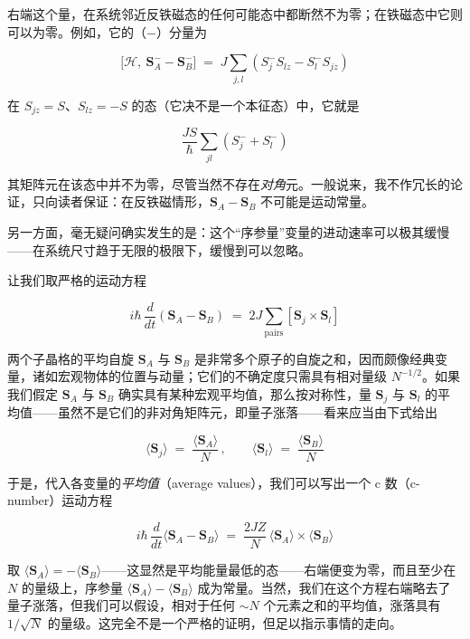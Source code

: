 右端这个量，在系统邻近反铁磁态的任何可能态中都断然不为零；在铁磁态中它则可以为零。例如，它的（−）分量为

\begin{equation*}
\bigl[\mathcal{H},\ \mathbf{S}_A^- - \mathbf{S}_B^-\bigr] \;=\; J\sum_{j,l} \left(S_j^- S_{lz} - S_l^- S_{jz}\right)
\end{equation*}

在 $S_{jz} = S$、$S_{lz} = -S$ 的态（它决不是一个本征态）中，它就是

\begin{equation*}
\frac{JS}{\hbar}\sum_{jl}\left(S_j^- + S_l^-\right)
\end{equation*}

其矩阵元在该态中并不为零，尽管当然不存在\emph{对角}元。一般说来，我不作冗长的论证，只向读者保证：在反铁磁情形，$\mathbf{S}_A - \mathbf{S}_B$ 不可能是运动常量。

另一方面，毫无疑问确实发生的是：这个“序参量”变量的进动速率可以极其缓慢——在系统尺寸趋于无限的极限下，缓慢到可以忽略。

让我们取严格的运动方程

\begin{equation*}
i\hbar\,\frac{d}{dt}\left(\mathbf{S}_A - \mathbf{S}_B\right) \;=\; 2J\sum_{\text{pairs}}\left[\mathbf{S}_j \times \mathbf{S}_l\right]
\end{equation*}

两个子晶格的平均自旋 $\mathbf{S}_A$ 与 $\mathbf{S}_B$ 是非常多个原子的自旋之和，因而颇像经典变量，诸如宏观物体的位置与动量；它们的不确定度只需具有相对量级 $N^{-1/2}$。如果我们假定 $\mathbf{S}_A$ 与 $\mathbf{S}_B$ 确实具有某种宏观平均值，那么按对称性，量 $\mathbf{S}_j$ 与 $\mathbf{S}_l$ 的平均值——虽然不是它们的非对角矩阵元，即量子涨落——看来应当由下式给出

\begin{equation*}
\langle \mathbf{S}_j\rangle \;=\; \frac{\langle \mathbf{S}_A\rangle}{N}\,,\qquad \langle \mathbf{S}_l\rangle \;=\; \frac{\langle \mathbf{S}_B\rangle}{N}
\end{equation*}

于是，代入各变量的\emph{平均值}（average values），我们可以写出一个 c 数（c-number）运动方程

\begin{equation*}
i\hbar\,\frac{d}{dt}\langle \mathbf{S}_A - \mathbf{S}_B\rangle \;=\; \frac{2JZ}{N}\,\langle \mathbf{S}_A\rangle \times \langle \mathbf{S}_B\rangle
\end{equation*}

取 $\langle \mathbf{S}_A\rangle = -\langle \mathbf{S}_B\rangle$——这显然是平均能量最低的态——右端便变为零，而且至少在 $N$ 的量级上，序参量 $\langle \mathbf{S}_A\rangle - \langle \mathbf{S}_B\rangle$ 成为常量。当然，我们在这个方程右端略去了量子涨落，但我们可以假设，相对于任何 $\sim N$ 个元素之和的平均值，涨落具有 $1/\sqrt{N}$ 的量级。这完全不是一个严格的证明，但足以指示事情的走向。

